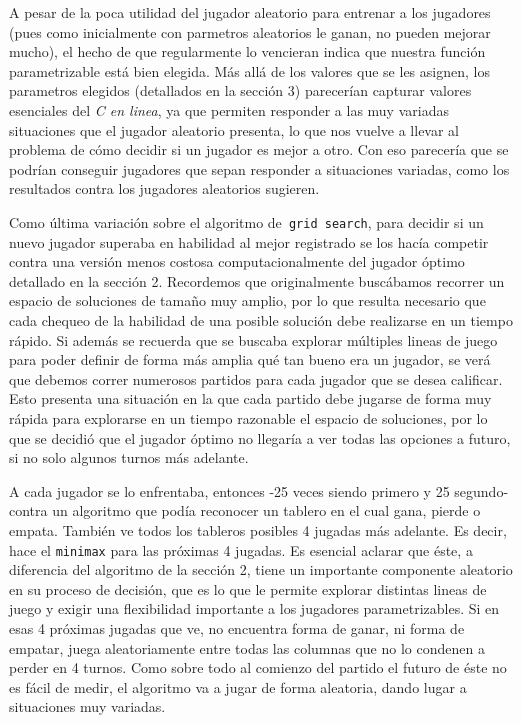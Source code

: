 \documentclass[A4paper,oneside,fleqn,11pt]{article}
\theoremstyle{definition}
\begin{document}
A pesar de la poca utilidad del jugador aleatorio para entrenar a los jugadores (pues como inicialmente con parmetros aleatorios le ganan, no pueden mejorar mucho), el hecho de que regularmente lo vencieran indica que nuestra función parametrizable está bien elegida. Más allá de los valores que se les asignen, los parametros elegidos (detallados en la sección 3) parecerían capturar valores esenciales del \textit{C en linea}, ya que permiten responder a las muy variadas situaciones que el jugador aleatorio presenta, lo que nos vuelve a llevar al problema de cómo decidir si un jugador es mejor a otro. Con eso parecería que se podrían conseguir jugadores que sepan responder a situaciones variadas, como los resultados contra los jugadores aleatorios sugieren.

Como última variación sobre el algoritmo de\texttt{ grid search}, para decidir si un nuevo jugador superaba en habilidad al mejor registrado se los hacía competir contra una versión menos costosa computacionalmente del jugador óptimo detallado en la sección 2. Recordemos que originalmente buscábamos recorrer un espacio de soluciones de tamaño muy amplio, por lo que resulta necesario que cada chequeo de la habilidad de una posible solución debe realizarse en un tiempo rápido. Si además se recuerda que se buscaba explorar múltiples lineas de juego para poder definir de forma más amplia qué tan bueno era un jugador, se verá que debemos correr numerosos partidos para cada jugador que se desea calificar. Esto presenta una situación en la que cada partido debe jugarse de forma muy rápida para explorarse en un tiempo razonable el espacio de soluciones, por lo que se decidió que el jugador óptimo no llegaría a ver todas las opciones a futuro, si no solo algunos turnos más adelante.

A cada jugador se lo enfrentaba, entonces -25 veces siendo primero y 25 segundo- contra un algoritmo que podía reconocer un tablero en el cual gana, pierde o empata. También ve todos los tableros posibles 4 jugadas más adelante. Es decir, hace el \texttt{minimax} para las próximas 4 jugadas. Es esencial aclarar que éste, a diferencia del algoritmo de la sección 2, tiene un importante componente aleatorio en su proceso de decisión, que es lo que le permite explorar distintas lineas de juego y exigir una flexibilidad importante a los jugadores parametrizables. Si en esas 4 próximas jugadas que ve, no encuentra forma de ganar, ni forma de empatar, juega aleatoriamente entre todas las columnas que no lo condenen a perder en 4 turnos. Como sobre todo al comienzo del partido el futuro de éste no es fácil de medir, el algoritmo va a jugar de forma aleatoria, dando lugar a situaciones muy variadas.
\end{document}
